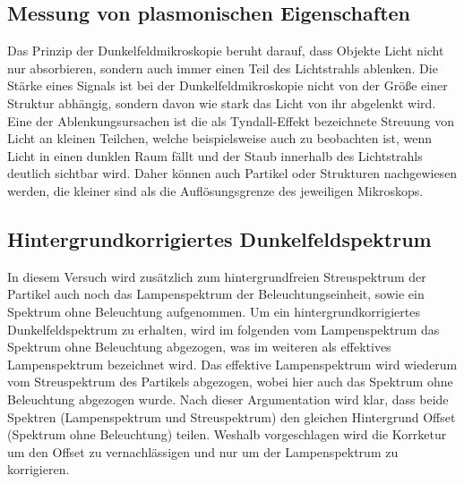 \subsection{Messung von plasmonischen Eigenschaften}
\label{sub:messungEigenschaften}

Das Prinzip der Dunkelfeldmikroskopie beruht darauf, dass Objekte Licht nicht nur absorbieren, sondern auch immer einen Teil des Lichtstrahls ablenken. Die Stärke eines Signals ist bei der Dunkelfeldmikroskopie nicht von der Größe einer Struktur abhängig, sondern davon wie stark das Licht von ihr abgelenkt wird. Eine der Ablenkungsursachen ist die als Tyndall-Effekt bezeichnete Streuung von Licht an kleinen Teilchen, welche beispielsweise auch zu beobachten ist, wenn Licht in einen dunklen Raum fällt und der Staub innerhalb des Lichtstrahls deutlich sichtbar wird. Daher können auch Partikel oder Strukturen nachgewiesen werden, die kleiner sind als die Auflösungsgrenze des jeweiligen Mikroskops. \cite{WikiDunkelfeld}

\subsection{Hintergrundkorrigiertes Dunkelfeldspektrum}
\label{sub:korrigiertesSignal}

In diesem Versuch wird zusätzlich zum hintergrundfreien Streuspektrum der Partikel auch noch das Lampenspektrum der Beleuchtungseinheit, sowie ein Spektrum ohne Beleuchtung aufgenommen. Um ein hintergrundkorrigiertes Dunkelfeldspektrum zu erhalten, wird im folgenden vom Lampenspektrum das Spektrum ohne Beleuchtung abgezogen, was im weiteren als effektives Lampenspektrum bezeichnet wird. Das effektive Lampenspektrum wird wiederum vom Streuspektrum des Partikels abgezogen, wobei hier auch das Spektrum ohne Beleuchtung abgezogen wurde. Nach dieser Argumentation wird klar, dass beide Spektren (Lampenspektrum und Streuspektrum) den gleichen Hintergrund Offset (Spektrum ohne Beleuchtung) teilen. Weshalb vorgeschlagen wird die Korrketur um den Offset zu vernachlässigen und nur um der Lampenspektrum zu korrigieren. 